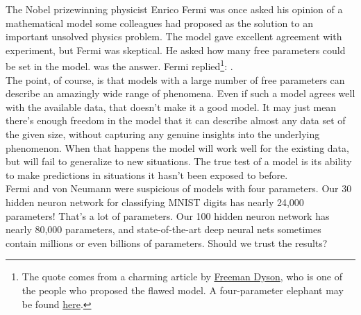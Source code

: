 \documentclass[a4paper,11pt,twoside]{report}
\begin{document}
The Nobel prizewinning physicist Enrico Fermi was once asked his opinion of a mathematical model some colleagues had proposed as the solution to an important unsolved physics problem. The model gave excellent agreement with experiment, but Fermi was skeptical. He asked how many free parameters could be set in the model.  was the answer. Fermi replied\footnote{The quote comes from a charming article by \href{https://www.nature.com/articles/427297a}{Freeman Dyson}, who is one of the people who proposed the flawed model. A four-parameter elephant may be found \href{https://www.johndcook.com/blog/2011/06/21/how-to-fit-an-elephant/}{here}.}: .\\

The point, of course, is that models with a large number of free parameters can describe an amazingly wide range of phenomena. Even if such a model agrees well with the available data, that doesn't make it a good model. It may just mean there's enough freedom in the model that it can describe almost any data set of the given size, without capturing any genuine insights into the underlying phenomenon. When that happens the model will work well for the existing data, but will fail to generalize to new situations. The true test of a model is its ability to make predictions in situations it hasn't been exposed to before.\\

Fermi and von Neumann were suspicious of models with four parameters. Our 30 hidden neuron network for classifying MNIST digits has nearly 24,000 parameters! That's a lot of parameters. Our 100 hidden neuron network has nearly 80,000 parameters, and state-of-the-art deep neural nets sometimes contain millions or even billions of parameters. Should we trust the results?\\
\end{document}
